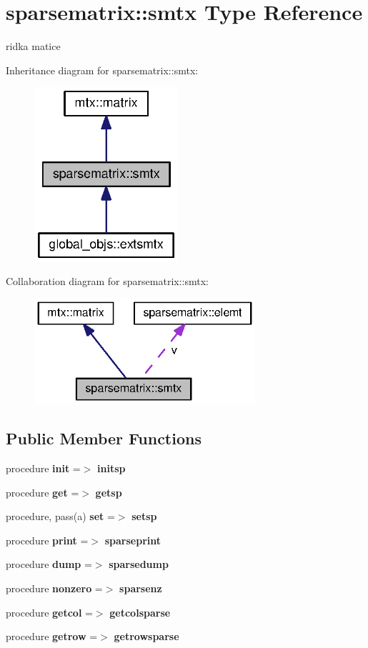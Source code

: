 \section{sparsematrix\+:\+:smtx Type Reference}
\label{structsparsematrix_1_1smtx}


ridka matice  




Inheritance diagram for sparsematrix\+:\+:smtx\+:\nopagebreak
\begin{figure}[H]
\begin{center}
\leavevmode
\includegraphics[width=151pt]{structsparsematrix_1_1smtx__inherit__graph}
\end{center}
\end{figure}


Collaboration diagram for sparsematrix\+:\+:smtx\+:\nopagebreak
\begin{figure}[H]
\begin{center}
\leavevmode
\includegraphics[width=232pt]{structsparsematrix_1_1smtx__coll__graph}
\end{center}
\end{figure}
\subsection*{Public Member Functions}
\begin{DoxyCompactItemize}
\item 
procedure {\bf init} =$>$ {\bf initsp}
\item 
procedure {\bf get} =$>$ {\bf getsp}
\item 
procedure, pass(a) {\bf set} =$>$ {\bf setsp}
\item 
procedure {\bf print} =$>$ {\bf sparseprint}
\item 
procedure {\bf dump} =$>$ {\bf sparsedump}
\item 
procedure {\bf nonzero} =$>$ {\bf sparsenz}
\item 
procedure {\bf getcol} =$>$ {\bf getcolsparse}
\item 
procedure {\bf getrow} =$>$ {\bf getrowsparse}
\end{DoxyCompactItemize}
